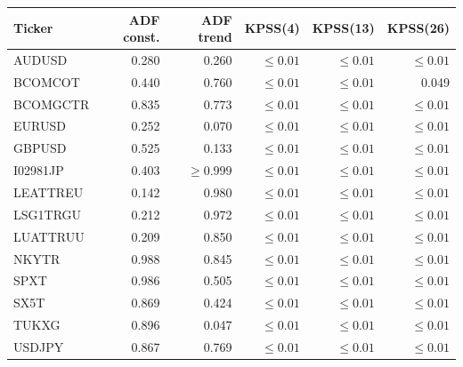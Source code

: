 \par\medskip\noindent
{\small
\begin{tabular}{@{}lrrrrr@{}}
\toprule
Ticker & ADF const. & ADF trend & KPSS(4) & KPSS(13) & KPSS(26)\\
\midrule
AUDUSD & 0.280 & 0.260 & $\leq 0.01$ & $\leq 0.01$ & $\leq 0.01$\\
BCOMCOT & 0.440 & 0.760 & $\leq 0.01$ & $\leq 0.01$ & 0.049\\
BCOMGCTR & 0.835 & 0.773 & $\leq 0.01$ & $\leq 0.01$ & $\leq 0.01$\\
EURUSD & 0.252 & 0.070 & $\leq 0.01$ & $\leq 0.01$ & $\leq 0.01$\\
GBPUSD & 0.525 & 0.133 & $\leq 0.01$ & $\leq 0.01$ & $\leq 0.01$\\
I02981JP & 0.403 & $\geq 0.999$ & $\leq 0.01$ & $\leq 0.01$ & $\leq 0.01$\\
LEATTREU & 0.142 & 0.980 & $\leq 0.01$ & $\leq 0.01$ & $\leq 0.01$\\
LSG1TRGU & 0.212 & 0.972 & $\leq 0.01$ & $\leq 0.01$ & $\leq 0.01$\\
LUATTRUU & 0.209 & 0.850 & $\leq 0.01$ & $\leq 0.01$ & $\leq 0.01$\\
NKYTR & 0.988 & 0.845 & $\leq 0.01$ & $\leq 0.01$ & $\leq 0.01$\\
SPXT & 0.986 & 0.505 & $\leq 0.01$ & $\leq 0.01$ & $\leq 0.01$\\
SX5T & 0.869 & 0.424 & $\leq 0.01$ & $\leq 0.01$ & $\leq 0.01$\\
TUKXG & 0.896 & 0.047 & $\leq 0.01$ & $\leq 0.01$ & $\leq 0.01$\\
USDJPY & 0.867 & 0.769 & $\leq 0.01$ & $\leq 0.01$ & $\leq 0.01$\\
\bottomrule
\end{tabular}
}
\par\medskip
